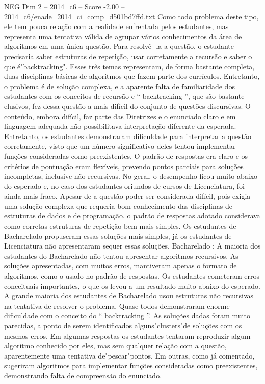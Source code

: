 \begin{textsample}{NEG Dim 2 – 2014\_c6 – Score -2.00 – 2014\_c6/enade\_2014\_ci\_comp\_d501bd7ffd.txt}
Como todo problema deste tipo, ele tem pouca relação com a realidade enfrentada pelos estudantes, mas representa uma tentativa válida de agrupar vários conhecimentos da área de algoritmos em uma única questão.
Para resolvê -la a questão, o estudante precisaria saber estruturas de repetição, usar corretamente a recursão e saber o que é"backtracking".
Esses três temas representam, de forma bastante completa, duas disciplinas básicas de algoritmos que fazem parte dos currículos.
Entretanto, o problema é de solução complexa, e a aparente falta de familiaridade dos estudantes com os conceitos de recursão e “ backtracking ”, que são bastante elusivos, fez dessa questão a mais difícil do conjunto de questões discursivas.
O conteúdo, embora difícil, faz parte das Diretrizes e o enunciado claro e em linguagem adequada não possibilitava interpretação diferente da esperada.
Entretanto, os estudantes demonstraram dificuldade para interpretar a questão corretamente, visto que um número significativo deles tentou implementar funções consideradas como preexistentes.
O padrão de respostas era claro e os critérios de pontuação eram flexíveis, prevendo pontos parciais para soluções incompletas, inclusive não recursivas.
No geral, o desempenho ficou muito abaixo do esperado e, no caso dos estudantes oriundos de cursos de Licenciatura, foi ainda mais fraco.
Apesar de a questão poder ser considerada difícil, pois exigia uma solução complexa que requeria bom conhecimento das disciplinas de estruturas de dados e de programação, o padrão de respostas adotado considerava como corretas estruturas de repetição bem mais simples.
Os estudantes de Bacharelado propuseram essas soluções mais simples, já os estudantes de Licenciatura não apresentaram sequer essas soluções.
Bacharelado : A maioria dos estudantes do Bacharelado não tentou apresentar algoritmos recursivos.
As soluções apresentadas, com muitos erros, mantiveram apenas o formato de algoritmos, como o usado no padrão de respostas.
Os estudantes cometeram erros conceituais importantes, o que os levou a um resultado muito abaixo do esperado.
A grande maioria dos estudantes de Bacharelado usou estruturas não recursivas na tentativa de resolver o problema.
Quase todos demonstraram enorme dificuldade com o conceito do “ backtracking ”.
As soluções dadas foram muito parecidas, a ponto de serem identificados alguns"clusters"de soluções com os mesmos erros.
Em algumas respostas os estudantes tentaram reproduzir algum algoritmo conhecido por eles, mas sem qualquer relação com a questão, aparentemente uma tentativa de"pescar"pontos.
Em outras, como já comentado, sugeriram algoritmos para implementar funções consideradas como preexistentes, demonstrando falta de compreensão do enunciado.

\end{textsample}
